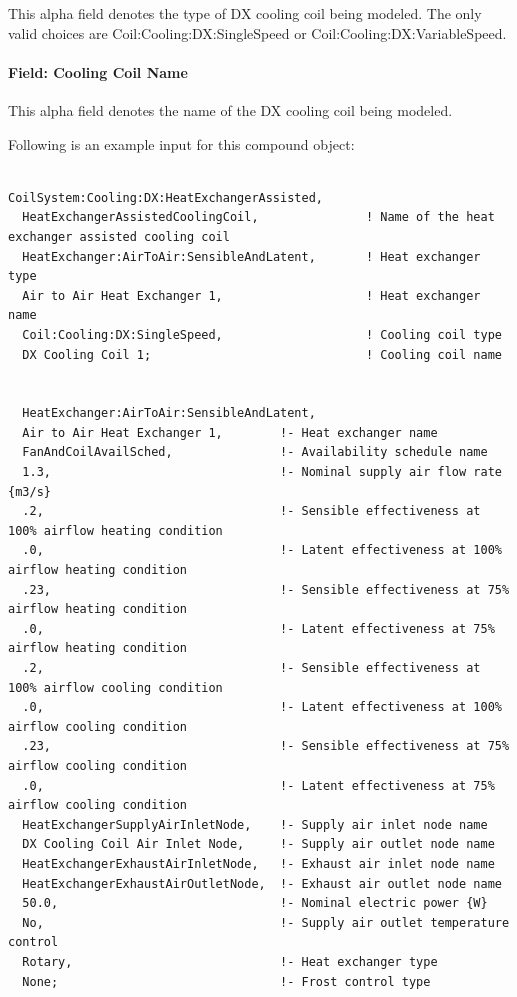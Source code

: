 This alpha field denotes the type of DX cooling coil being modeled. The only valid choices are Coil:Cooling:DX:SingleSpeed or Coil:Cooling:DX:VariableSpeed.

\paragraph{Field: Cooling Coil Name}\label{field-cooling-coil-name-1}

This alpha field denotes the name of the DX cooling coil being modeled.

Following is an example input for this compound object:

\begin{lstlisting}

CoilSystem:Cooling:DX:HeatExchangerAssisted,
  HeatExchangerAssistedCoolingCoil,               ! Name of the heat exchanger assisted cooling coil
  HeatExchanger:AirToAir:SensibleAndLatent,       ! Heat exchanger type
  Air to Air Heat Exchanger 1,                    ! Heat exchanger name
  Coil:Cooling:DX:SingleSpeed,                    ! Cooling coil type
  DX Cooling Coil 1;                              ! Cooling coil name


  HeatExchanger:AirToAir:SensibleAndLatent,
  Air to Air Heat Exchanger 1,        !- Heat exchanger name
  FanAndCoilAvailSched,               !- Availability schedule name
  1.3,                                !- Nominal supply air flow rate {m3/s}
  .2,                                 !- Sensible effectiveness at 100% airflow heating condition
  .0,                                 !- Latent effectiveness at 100% airflow heating condition
  .23,                                !- Sensible effectiveness at 75% airflow heating condition
  .0,                                 !- Latent effectiveness at 75% airflow heating condition
  .2,                                 !- Sensible effectiveness at 100% airflow cooling condition
  .0,                                 !- Latent effectiveness at 100% airflow cooling condition
  .23,                                !- Sensible effectiveness at 75% airflow cooling condition
  .0,                                 !- Latent effectiveness at 75% airflow cooling condition
  HeatExchangerSupplyAirInletNode,    !- Supply air inlet node name
  DX Cooling Coil Air Inlet Node,     !- Supply air outlet node name
  HeatExchangerExhaustAirInletNode,   !- Exhaust air inlet node name
  HeatExchangerExhaustAirOutletNode,  !- Exhaust air outlet node name
  50.0,                               !- Nominal electric power {W}
  No,                                 !- Supply air outlet temperature control
  Rotary,                             !- Heat exchanger type
  None;                               !- Frost control type



\end{lstlisting}
